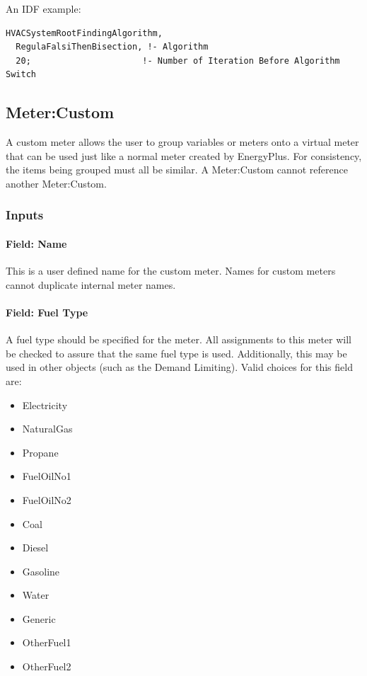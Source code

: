 An IDF example:

\begin{lstlisting}
HVACSystemRootFindingAlgorithm,
  RegulaFalsiThenBisection, !- Algorithm
  20;                      !- Number of Iteration Before Algorithm Switch
\end{lstlisting}

\subsection{Meter:Custom}\label{metercustom}

A custom meter allows the user to group variables or meters onto a virtual meter that can be used just like a normal meter created by EnergyPlus. For consistency, the items being grouped must all be similar. A Meter:Custom cannot reference another Meter:Custom.

\subsubsection{Inputs}\label{inputs-17-008}

\paragraph{Field: Name}\label{field-name-043}

This is a user defined name for the custom meter. Names for custom meters cannot duplicate internal meter names.

\paragraph{Field: Fuel Type}\label{field-fuel-type-004}

A fuel type should be specified for the meter. All assignments to this meter will be checked to assure that the same fuel type is used. Additionally, this may be used in other objects (such as the Demand Limiting). Valid choices for this field are:

\begin{itemize}
\item
  Electricity
\item
  NaturalGas
\item
  Propane
\item
  FuelOilNo1
\item
  FuelOilNo2
\item
  Coal
\item
  Diesel
\item
  Gasoline
\item
  Water
\item
  Generic
\item
  OtherFuel1
\item
  OtherFuel2
\end{itemize}

